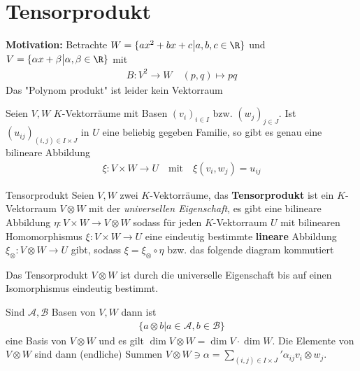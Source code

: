 \section{Tensorprodukt}

\textbf{Motivation:} \quad Betrachte $W = \{ax^2+bx+c \big\vert a,b,c \in \R\}$ und $V = \{\alpha x + \beta \big\vert \alpha, \beta \in \R\}$ mit
\begin{align*}
    B: V^2 \to W \quad (p,q) \mapsto pq
\end{align*}
Das "Polynom produkt" ist leider kein Vektorraum


Seien $V, W$ $K$-Vektorräume mit Basen $(v_i)_{i\in I}$ bzw. $(w_j)_{j \in J}$. Ist $(u_{ij})_{(i,j) \in I \times J}$ in $U$ eine beliebig gegeben Familie, so gibt es genau eine bilineare Abbildung
\begin{align*}
    \xi: V \times W \to U \quad \text{mit} \quad \xi(v_i,w_j) = u_{ij}
\end{align*}

\begin{definition}{Tensorprodukt}
    Seien $V,W$ zwei $K$-Vektorräume, das \textbf{Tensorprodukt} ist ein $K$-Vektorraum $V \otimes W$ mit der \emph{universellen Eigenschaft}, es gibt eine bilineare Abbildung $\eta: V \times W \to V \otimes W$ sodass für jeden $K$-Vektorraum $U$ mit bilinearen Homomorphismus $\xi: V \times W \to U$ eine eindeutig bestimmte \textbf{lineare} Abbildung $\xi_{\otimes}: V \otimes W \to U$ gibt, sodass $\xi = \xi_{\otimes} \circ \eta$ bzw. das folgende diagram kommutiert
    \begin{center}
    \end{center}
    Das Tensorprodukt $V \otimes W$ ist durch die universelle Eigenschaft bis auf einen Isomorphismus eindeutig bestimmt.
\end{definition}
Sind $\mathcal{A}, \mathcal{B}$ Basen von $V,W$ dann ist
\begin{align*}
    \{a \otimes b \big\vert a \in \mathcal{A}, b \in \mathcal{B}\}
\end{align*}
eine Basis von $V \otimes W$ und es gilt $\dim V \otimes W = \dim V \cdot \dim W$. Die Elemente von $V \otimes W$ sind dann (endliche) Summen $V \otimes W \ni \alpha = \sum_{(i,j) \in I \times J}' \alpha_{ij} v_i \otimes w_j$.

